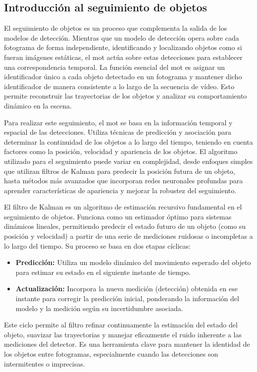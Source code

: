 \documentclass[11pt,spanish,listoffigures,listoftables]{tfgetsinf}
\begin{document}
\subsection{Introducción al seguimiento de objetos} \label{sec:introduccion_seguimiento_objetos}
El seguimiento de objetos es un proceso que complementa la salida de los modelos de detección. Mientras que un modelo de detección opera sobre cada fotograma de forma independiente, identificando y localizando objetos como si fueran imágenes estáticas, el \gls{mot} actúa sobre estas detecciones para establecer una correspondencia temporal. La función esencial del \gls{mot} es asignar un identificador único a cada objeto detectado en un fotograma y mantener dicho identificador de manera consistente a lo largo de la secuencia de vídeo. Esto permite reconstruir las trayectorias de los objetos y analizar su comportamiento dinámico en la escena.

Para realizar este seguimiento, el \gls{mot} se basa en la información temporal y espacial de las detecciones. Utiliza técnicas de predicción y asociación para determinar la continuidad de los objetos a lo largo del tiempo, teniendo en cuenta factores como la posición, velocidad y apariencia de los objetos. El algoritmo utilizado para el seguimiento puede variar en complejidad, desde enfoques simples que utilizan filtros de Kalman para predecir la posición futura de un objeto, hasta métodos más avanzados que incorporan redes neuronales profundas para aprender características de apariencia y mejorar la robustez del seguimiento.


El filtro de Kalman es un algoritmo de estimación recursivo fundamental en el seguimiento de objetos. Funciona como un estimador óptimo para sistemas dinámicos lineales, permitiendo predecir el estado futuro de un objeto (como su posición y velocidad) a partir de una serie de mediciones ruidosas o incompletas a lo largo del tiempo. Su proceso se basa en dos etapas cíclicas:
\begin{itemize}
   \item \textbf{Predicción:} Utiliza un modelo dinámico del movimiento esperado del objeto para estimar su estado en el siguiente instante de tiempo.
   \item \textbf{Actualización:} Incorpora la nueva medición (detección) obtenida en ese instante para corregir la predicción inicial, ponderando la información del modelo y la medición según su incertidumbre asociada.
\end{itemize}
Este ciclo permite al filtro refinar continuamente la estimación del estado del objeto, suavizar las trayectorias y manejar eficazmente el ruido inherente a las mediciones del detector. Es una herramienta clave para mantener la identidad de los objetos entre fotogramas, especialmente cuando las detecciones son intermitentes o imprecisas.
\end{document}
